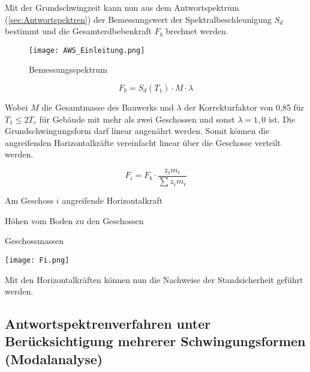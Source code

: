 Mit der Grundschwingzeit kann nun aus dem Antwortspektrum (\cref{sec:Antwortspektren}) der Bemessungswert der Spektralbeschleunigung $S_d$ bestimmt und die Gesamterdbebenkraft $F_b$ brechnet werden.

\begin{figure}[H]
    \centering
    \texttt{[image: AWS\_Einleitung.png]}
    \caption{Bemessungsspektrum}
\end{figure}

\begin{equation*}
F_b = S_d(T_1) \cdot M \cdot \lambda
\end{equation*}

Wobei $M$ die Gesamtmasse des Bauwerks und $\lambda$ der Korrekturfaktor von 0,85 für $T_1 \leq 2T_c$ für Gebäude mit mehr als zwei Geschossen und sonst $\lambda=1,0$ ist.
Die Grundschwingungsform darf linear angenährt werden. Somit können die angreifenden Horizontalkräfte vereinfacht linear über die Geschosse verteilt werden.

\begin{minipage}{0.6\textwidth}

\begin{equation*}
F_i = F_b \cdot \frac{z_i m_i}{\sum z_i m_i}
\end{equation*}

\vspace{2ex}
\vspace{2ex}

  Am Geschoss $i$ angreifende Horizontalkraft\par
{}  Höhen vom Boden zu den Geschossen\par
{}  Geschossmassen\par

\end{minipage}%
\hfill
\begin{minipage}{0.4\textwidth}

\begin{flushright}
\texttt{[image: Fi.png]}
\end{flushright}

\end{minipage}%

Mit den Horizontalkräften können nun die Nachweise der Standsicherheit geführt werden.

\subsection{Antwortspektrenverfahren unter Berücksichtigung mehrerer Schwingungsformen (Modalanalyse)}
\label{sec:Modalanalyse}

